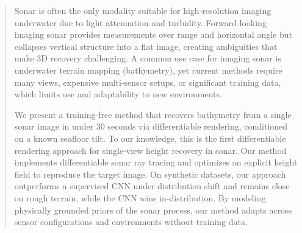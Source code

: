 \begin{abstract}
Sonar is often the only modality suitable for high-resolution imaging underwater due to light attenuation and turbidity. Forward-looking imaging sonar provides measurements over range and horizontal angle but collapses vertical structure into a flat image, creating ambiguities that make 3D recovery challenging. A common use case for imaging sonar is underwater terrain mapping (bathymetry), yet current methods require many views, expensive multi-sensor setups, or significant training data, which limits use and adaptability to new environments. 

We present a training-free method that recovers bathymetry from a single sonar image in under 30 seconds via differentiable rendering, conditioned on a known seafloor tilt. To our knowledge, this is the first differentiable rendering approach for single-view height recovery in sonar. Our method implements differentiable sonar ray tracing and optimizes an explicit height field to reproduce the target image. On synthetic datasets, our approach outperforms a supervised CNN under distribution shift and remains close on rough terrain, while the CNN wins in-distribution. By modeling physically grounded priors of the sonar process, our method adapts across sensor configurations and environments without training data.
\end{abstract}

